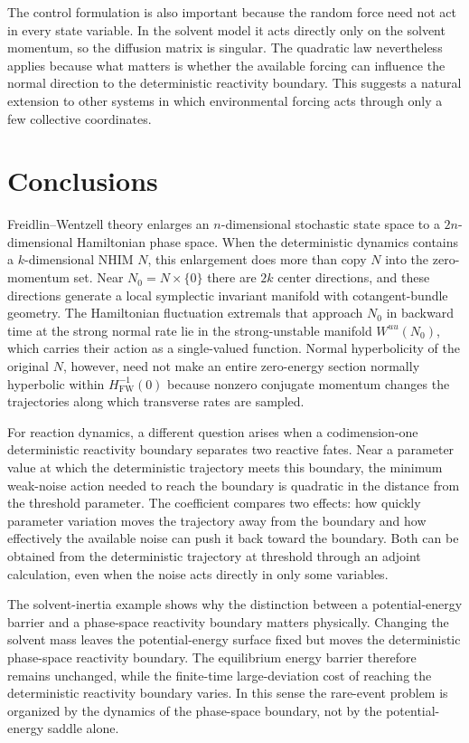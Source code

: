 \documentclass[11pt]{article}
\theoremstyle{definition}
\theoremstyle{remark}
\begin{document}
The control formulation is also important because the random force need not act in every state variable.  In the solvent model it acts directly only on the solvent momentum, so the diffusion matrix is singular.  The quadratic law nevertheless applies because what matters is whether the available forcing can influence the normal direction to the deterministic reactivity boundary.  This suggests a natural extension to other systems in which environmental forcing acts through only a few collective coordinates.

\section{Conclusions}

Freidlin--Wentzell theory enlarges an $n$-dimensional stochastic state space to a $2n$-dimensional Hamiltonian phase space.  When the deterministic dynamics contains a $k$-dimensional NHIM $N$, this enlargement does more than copy $N$ into the zero-momentum set.  Near $N_0=N\times\{0\}$ there are $2k$ center directions, and these directions generate a local symplectic invariant manifold with cotangent-bundle geometry.  The Hamiltonian fluctuation extremals that approach $N_0$ in backward time at the strong normal rate lie in the strong-unstable manifold $W^{uu}(N_0)$, which carries their action as a single-valued function.  Normal hyperbolicity of the original $N$, however, need not make an entire zero-energy section normally hyperbolic within $H_{\mathrm{FW}}^{-1}(0)$ because nonzero conjugate momentum changes the trajectories along which transverse rates are sampled.

For reaction dynamics, a different question arises when a codimension-one deterministic reactivity boundary separates two reactive fates.  Near a parameter value at which the deterministic trajectory meets this boundary, the minimum weak-noise action needed to reach the boundary is quadratic in the distance from the threshold parameter.  The coefficient compares two effects: how quickly parameter variation moves the trajectory away from the boundary and how effectively the available noise can push it back toward the boundary.  Both can be obtained from the deterministic trajectory at threshold through an adjoint calculation, even when the noise acts directly in only some variables.

The solvent-inertia example shows why the distinction between a potential-energy barrier and a phase-space reactivity boundary matters physically.  Changing the solvent mass leaves the potential-energy surface fixed but moves the deterministic phase-space reactivity boundary.  The equilibrium energy barrier therefore remains unchanged, while the finite-time large-deviation cost of reaching the deterministic reactivity boundary varies.  In this sense the rare-event problem is organized by the dynamics of the phase-space boundary, not by the potential-energy saddle alone.
\end{document}

